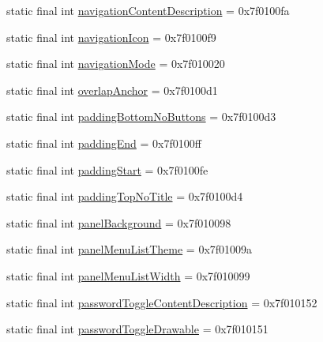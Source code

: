 \begin{CompactItemize}
\item 
static final int \hyperlink{classandroid_1_1support_1_1v7_1_1mediarouter_1_1_r_1_1attr_68df6e98147ae425e1d8d1ece66c61ce}{navigationContentDescription} = 0x7f0100fa
\item 
static final int \hyperlink{classandroid_1_1support_1_1v7_1_1mediarouter_1_1_r_1_1attr_e3439952e65c4ee890b282b97efb0d2c}{navigationIcon} = 0x7f0100f9
\item 
static final int \hyperlink{classandroid_1_1support_1_1v7_1_1mediarouter_1_1_r_1_1attr_13b50f14f8998d48ecdd64276ff510db}{navigationMode} = 0x7f010020
\item 
static final int \hyperlink{classandroid_1_1support_1_1v7_1_1mediarouter_1_1_r_1_1attr_8bd8ce8b45fa53f23a4d256cf3ea0025}{overlapAnchor} = 0x7f0100d1
\item 
static final int \hyperlink{classandroid_1_1support_1_1v7_1_1mediarouter_1_1_r_1_1attr_e04a62d19d741ffbea39944ab690af93}{paddingBottomNoButtons} = 0x7f0100d3
\item 
static final int \hyperlink{classandroid_1_1support_1_1v7_1_1mediarouter_1_1_r_1_1attr_9403a630ddf6aca0b6edfcea08483b9d}{paddingEnd} = 0x7f0100ff
\item 
static final int \hyperlink{classandroid_1_1support_1_1v7_1_1mediarouter_1_1_r_1_1attr_f94a9555456f9be0c66eea0f18e39d73}{paddingStart} = 0x7f0100fe
\item 
static final int \hyperlink{classandroid_1_1support_1_1v7_1_1mediarouter_1_1_r_1_1attr_2cff67b67694efb7b3bb11816bde5c63}{paddingTopNoTitle} = 0x7f0100d4
\item 
static final int \hyperlink{classandroid_1_1support_1_1v7_1_1mediarouter_1_1_r_1_1attr_814ee90a8ad5bc9e9fed670aaf9f34e8}{panelBackground} = 0x7f010098
\item 
static final int \hyperlink{classandroid_1_1support_1_1v7_1_1mediarouter_1_1_r_1_1attr_ebbd9878f2af4eeedc70f2a97ad8649c}{panelMenuListTheme} = 0x7f01009a
\item 
static final int \hyperlink{classandroid_1_1support_1_1v7_1_1mediarouter_1_1_r_1_1attr_2c2846e25840e34a1afb15106408f8eb}{panelMenuListWidth} = 0x7f010099
\item 
static final int \hyperlink{classandroid_1_1support_1_1v7_1_1mediarouter_1_1_r_1_1attr_241e88115b79c7502fc356491642af22}{passwordToggleContentDescription} = 0x7f010152
\item 
static final int \hyperlink{classandroid_1_1support_1_1v7_1_1mediarouter_1_1_r_1_1attr_4316f364de18a870f40de9e2d2a62be9}{passwordToggleDrawable} = 0x7f010151

\end{CompactItemize}
